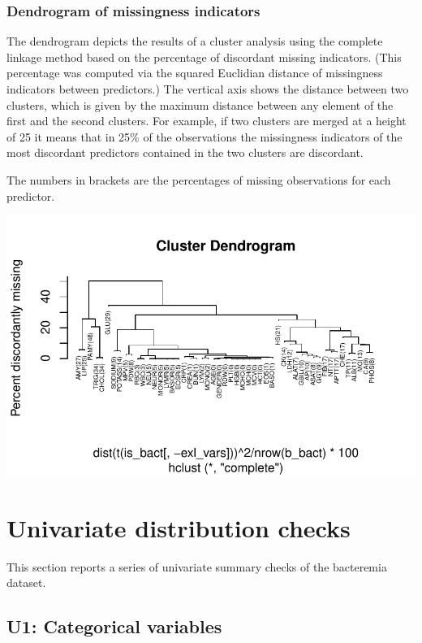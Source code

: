 \documentclass[
  letterpaper,
  DIV=11,
  numbers=noendperiod]{scrreport}
\begin{document}
\hypertarget{dendrogram-of-missingness-indicators}{%
\subsection{Dendrogram of missingness
indicators}\label{dendrogram-of-missingness-indicators}}

The dendrogram depicts the results of a cluster analysis using the
complete linkage method based on the percentage of discordant missing
indicators. (This percentage was computed via the squared Euclidian
distance of missingness indicators between predictors.) The vertical
axis shows the distance between two clusters, which is given by the
maximum distance between any element of the first and the second
clusters. For example, if two clusters are merged at a height of 25 it
means that in 25\% of the observations the missingness indicators of the
most discordant predictors contained in the two clusters are discordant.

The numbers in brackets are the percentages of missing observations for
each predictor.

\includegraphics{./Bact_missing_files/figure-pdf/unnamed-chunk-5-1.pdf}


\hypertarget{univariate-distribution-checks}{%
\chapter{Univariate distribution
checks}\label{univariate-distribution-checks}}

This section reports a series of univariate summary checks of the
bacteremia dataset.

\hypertarget{u1-categorical-variables}{%
\section{U1: Categorical variables}\label{u1-categorical-variables}}
\end{document}
